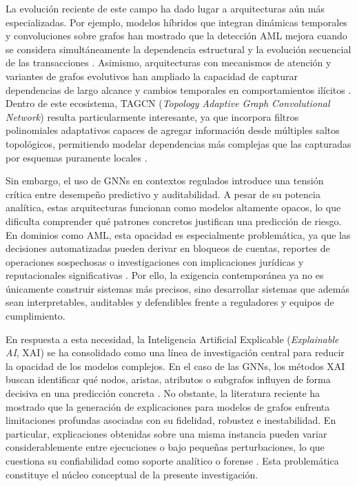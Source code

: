 \bigskip

La evolución reciente de este campo ha dado lugar a arquitecturas aún más especializadas. Por ejemplo, modelos híbridos que integran dinámicas temporales y convoluciones sobre grafos han mostrado que la detección AML mejora cuando se considera simultáneamente la dependencia estructural y la evolución secuencial de las transacciones \cite{Alarab2023Graph-basedData, Wan2024AMemory}. Asimismo, arquitecturas con mecanismos de atención y variantes de grafos evolutivos han ampliado la capacidad de capturar dependencias de largo alcance y cambios temporales en comportamientos ilícitos \cite{Cui2024EG-SAN:Cryptocurrency, Lin2026DetectingLaundering}. Dentro de este ecosistema, TAGCN (\textit{Topology Adaptive Graph Convolutional Network}) resulta particularmente interesante, ya que incorpora filtros polinomiales adaptativos capaces de agregar información desde múltiples saltos topológicos, permitiendo modelar dependencias más complejas que las capturadas por esquemas puramente locales \cite{Du2017TopologyNetworks, He2026AnDetection}.

\bigskip

Sin embargo, el uso de GNNs en contextos regulados introduce una tensión crítica entre desempeño predictivo y auditabilidad. A pesar de su potencia analítica, estas arquitecturas funcionan como modelos altamente opacos, lo que dificulta comprender qué patrones concretos justifican una predicción de riesgo. En dominios como AML, esta opacidad es especialmente problemática, ya que las decisiones automatizadas pueden derivar en bloqueos de cuentas, reportes de operaciones sospechosas o investigaciones con implicaciones jurídicas y reputacionales significativas \cite{FATF2012InternationalRecommendations, Spotlight2021Cryptocurrencies:Finances}. Por ello, la exigencia contemporánea ya no es únicamente construir sistemas más precisos, sino desarrollar sistemas que además sean interpretables, auditables y defendibles frente a reguladores y equipos de cumplimiento.

\bigskip

En respuesta a esta necesidad, la Inteligencia Artificial Explicable (\textit{Explainable AI}, XAI) se ha consolidado como una línea de investigación central para reducir la opacidad de los modelos complejos. En el caso de las GNNs, los métodos XAI buscan identificar qué nodos, aristas, atributos o subgrafos influyen de forma decisiva en una predicción concreta \cite{Adadi2018PeekingXAI, Ying2019Gnnexplainer:Networks, Luo2020ParameterizedNetwork, Akkas2024Gnnshap:Values}. No obstante, la literatura reciente ha mostrado que la generación de explicaciones para modelos de grafos enfrenta limitaciones profundas asociadas con su fidelidad, robustez e inestabilidad. En particular, explicaciones obtenidas sobre una misma instancia pueden variar considerablemente entre ejecuciones o bajo pequeñas perturbaciones, lo que cuestiona su confiabilidad como soporte analítico o forense \cite{Gawantka2024AExplanations, Agarwal2022ProbingMethods,Kosan2023GNNX-BENCH:Benchmarking}. Esta problemática constituye el núcleo conceptual de la presente investigación.

